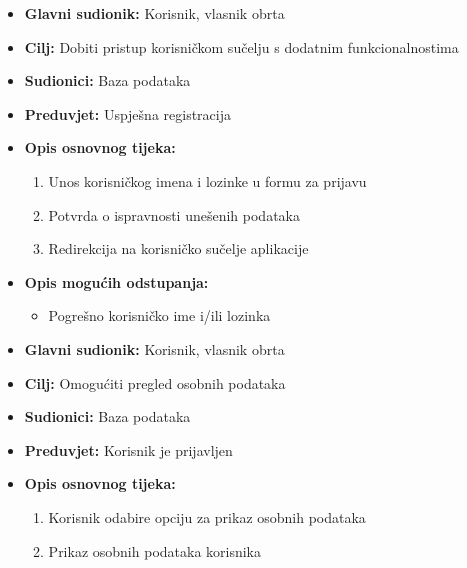 			\noindent{}
				\begin{itemize}
					\item \textbf{Glavni sudionik: } Korisnik, vlasnik obrta 
					\item \textbf{Cilj: }Dobiti pristup korisničkom sučelju s dodatnim funkcionalnostima
					\item \textbf{Sudionici: } Baza podataka 
					\item \textbf{Preduvjet: } Uspješna registracija 
					\item \textbf{Opis osnovnog tijeka: }
					\begin{enumerate}
						\item Unos korisničkog imena i lozinke u formu za prijavu
						\item Potvrda o ispravnosti unešenih podataka
						\item Redirekcija na korisničko sučelje aplikacije
					\end{enumerate}
					\item \textbf{Opis mogućih odstupanja:}
					\begin{itemize}
						\item Pogrešno korisničko ime i/ili lozinka
					\end{itemize}
				\end{itemize}
					
			\noindent{}
				\begin{itemize}
					\item \textbf{Glavni sudionik: } Korisnik, vlasnik obrta 
					\item \textbf{Cilj: }Omogućiti pregled osobnih podataka 
					\item \textbf{Sudionici: } Baza podataka 
					\item \textbf{Preduvjet: } Korisnik je prijavljen 
					\item \textbf{Opis osnovnog tijeka: }
					\begin{enumerate}
						\item Korisnik odabire opciju za prikaz osobnih podataka
						\item Prikaz osobnih podataka korisnika
					\end{enumerate}
				\end{itemize}
						
